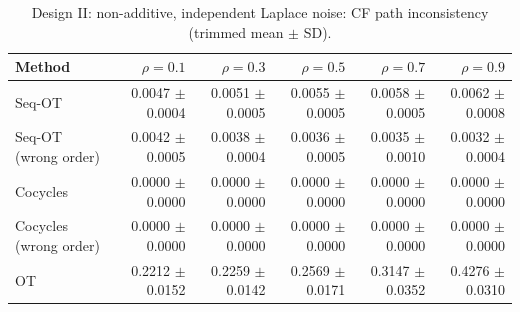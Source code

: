 \begin{table}[t]
\centering
\caption{Design II: non-additive, independent Laplace noise: CF path inconsistency (trimmed mean $\pm$ SD).}
\begin{tabular}{lrrrrr}
\toprule
Method & $\rho=0.1$ & $\rho=0.3$ & $\rho=0.5$ & $\rho=0.7$ & $\rho=0.9$ \\
\midrule
Seq-OT & 0.0047 $\pm$ 0.0004 & 0.0051 $\pm$ 0.0005 & 0.0055 $\pm$ 0.0005 & 0.0058 $\pm$ 0.0005 & 0.0062 $\pm$ 0.0008 \\
Seq-OT (wrong order) & 0.0042 $\pm$ 0.0005 & 0.0038 $\pm$ 0.0004 & 0.0036 $\pm$ 0.0005 & 0.0035 $\pm$ 0.0010 & 0.0032 $\pm$ 0.0004 \\
Cocycles & 0.0000 $\pm$ 0.0000 & 0.0000 $\pm$ 0.0000 & 0.0000 $\pm$ 0.0000 & 0.0000 $\pm$ 0.0000 & 0.0000 $\pm$ 0.0000 \\
Cocycles (wrong order) & 0.0000 $\pm$ 0.0000 & 0.0000 $\pm$ 0.0000 & 0.0000 $\pm$ 0.0000 & 0.0000 $\pm$ 0.0000 & 0.0000 $\pm$ 0.0000 \\
OT & 0.2212 $\pm$ 0.0152 & 0.2259 $\pm$ 0.0142 & 0.2569 $\pm$ 0.0171 & 0.3147 $\pm$ 0.0352 & 0.4276 $\pm$ 0.0310 \\
\bottomrule
\end{tabular}
\end{table}
